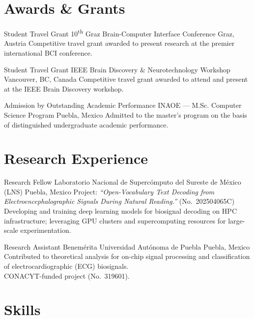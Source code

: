 \documentclass[11pt,a4paper,sans]{moderncv}
\begin{document}
\section{Awards \& Grants}

  {Student Travel Grant}
  {10\textsuperscript{th} Graz Brain-Computer Interface Conference}
  {Graz, Austria}{}
  {Competitive travel grant awarded to present research at the premier international BCI conference.}

  {Student Travel Grant}
  {IEEE Brain Discovery \& Neurotechnology Workshop}
  {Vancouver, BC, Canada}{}
  {Competitive travel grant awarded to attend and present at the IEEE Brain Discovery workshop.}

  {Admission by Outstanding Academic Performance}
  {INAOE --- M.Sc. Computer Science Program}
  {Puebla, Mexico}{}
  {Admitted to the master's program on the basis of distinguished undergraduate academic performance.}

\section{Research Experience}

  {Research Fellow}
  {Laboratorio Nacional de Supercómputo del Sureste de M\'exico (LNS)}
  {Puebla, Mexico}{}
  {Project: \textit{``Open-Vocabulary Text Decoding from Electroencephalographic Signals During Natural Reading.''} (No.\ 202504065C)\\
   Developing and training deep learning models for biosignal decoding on HPC infrastructure; leveraging GPU clusters and supercomputing resources for large-scale experimentation.}

  {Research Assistant}
  {Benem\'erita Universidad Aut\'onoma de Puebla}
  {Puebla, Mexico}{}
  {Contributed to theoretical analysis for on-chip signal processing and classification of electrocardiographic (ECG) biosignals.\\
   CONACYT-funded project (No.\ 319601).}

\section{Skills}
\end{document}
